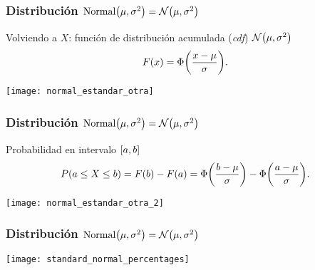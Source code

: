 \documentclass[table]{beamer}
\begin{document}
\begin{frame}
    \frametitle{Distribución $\text{Normal} \parens{\mu, \sigma^{2}} = \normal{\mu}{\sigma^{2}}$}
    \begin{block}{Volviendo a $X$: función de distribución acumulada (\emph{cdf}) $\normal{\mu}{\sigma^{2}}$}
        \begin{equation*}
            \FF{x} = \Phi \parens{\frac{x - \mu}{\sigma}} .
        \end{equation*}
    \end{block}
    \begin{center}
        \texttt{[image: normal\_estandar\_otra]}
    \end{center}
\end{frame}




\begin{frame}
    \frametitle{Distribución $\text{Normal} \parens{\mu, \sigma^{2}} = \normal{\mu}{\sigma^{2}}$}
    \begin{block}{Probabilidad en intervalo $\sparens{a, b}$}
        \begin{equation*}
            \prob{a \leq X \leq b} = \FF{b} - \FF{a}
            = \Phi \parens{\frac{b - \mu}{\sigma}}
            - \Phi \parens{\frac{a - \mu}{\sigma}} .
        \end{equation*}
    \end{block}
    \begin{center}
        \texttt{[image: normal\_estandar\_otra\_2]}
    \end{center}
\end{frame}

\begin{frame}
    \frametitle{Distribución $\text{Normal} \parens{\mu, \sigma^{2}} = \normal{\mu}{\sigma^{2}}$}
    \begin{center}
        \texttt{[image: standard\_normal\_percentages]}
    \end{center}
\end{frame}
\end{document}
